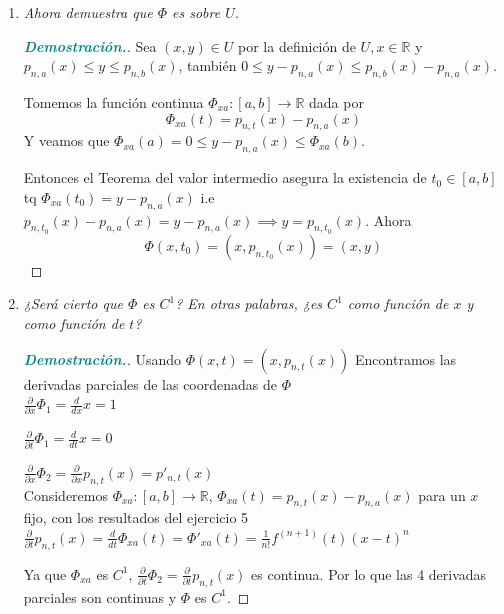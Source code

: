 \documentclass[12pt, letterpaper]{article}
\begin{document}
\begin{enumerate}[label=(\alph*)]
    \item \textit{Ahora demuestra que $\Phi$ es sobre $U$.}
    
   \begin{proof}[\textbf{\textcolor{teal}{Demostración.}}]
        Sea $(x,y) \in U$ por la definición de $U, x \in \mathbb{R}$ y $p_{n,a}(x) \leq y \leq p_{n,b}(x)$, también $0 \leq y - p_{n,a}(x) \leq p_{n,b}(x) - p_{n,a}(x)$.
        
        Tomemos la función continua $\Phi_{xa} : [a,b] \to \mathbb{R}$ dada por
        \[ \Phi_{xa}(t) = p_{n,t}(x) - p_{n,a}(x) \]
        Y veamos que $\Phi_{xa}(a) = 0 \leq y - p_{n,a}(x) \leq \Phi_{xa}(b)$.
        
        Entonces el Teorema del valor intermedio asegura la existencia de $t_0 \in [a,b]$ tq $\Phi_{xa}(t_0) = y - p_{n,a}(x)$ i.e $p_{n,t_0}(x) - p_{n,a}(x) = y - p_{n,a}(x) \implies y = p_{n,t_0}(x)$.
        Ahora
        \[ \Phi(x, t_0) = (x, p_{n,t_0}(x)) = (x, y) \]
    \end{proof}
    
    \item \textit{¿Será cierto que $\Phi$ es $C^1$? En otras palabras, ¿es $C^1$ como función de $x$ y como función de $t$?}
    
   \begin{proof}[\textbf{\textcolor{teal}{Demostración.}}]
        Usando $\Phi(x,t) = (x, p_{n,t}(x))$
        Encontramos las derivadas parciales de las coordenadas de $\Phi$\\
        
        $\frac{\partial}{\partial x} \Phi_1 = \frac{d}{dx} x = 1$
        
        $\frac{\partial}{\partial t} \Phi_1 = \frac{d}{dt} x = 0$
        
        $\frac{\partial}{\partial x} \Phi_2 = \frac{\partial}{\partial x} p_{n,t}(x) = p'_{n,t}(x)$\\
        
        Consideremos $\Phi_{xa} : [a,b] \to \mathbb{R}$, $\Phi_{xa}(t) = p_{n,t}(x) - p_{n,a}(x)$ para un $x$ fijo, con los resultados del ejercicio 5
        $\frac{\partial}{\partial t} p_{n,t}(x) = \frac{d}{dt} \Phi_{xa}(t) = \Phi'_{xa}(t) = \frac{1}{n!} f^{(n+1)}(t)(x-t)^n$
        
        Ya que $\Phi_{xa}$ es $C^1$, $\frac{\partial}{\partial t} \Phi_2 = \frac{\partial}{\partial t} p_{n,t}(x)$ es continua.
        Por lo que las 4 derivadas parciales son continuas y $\Phi$ es $C^1$.
    \end{proof}
\end{enumerate}
\end{document}
